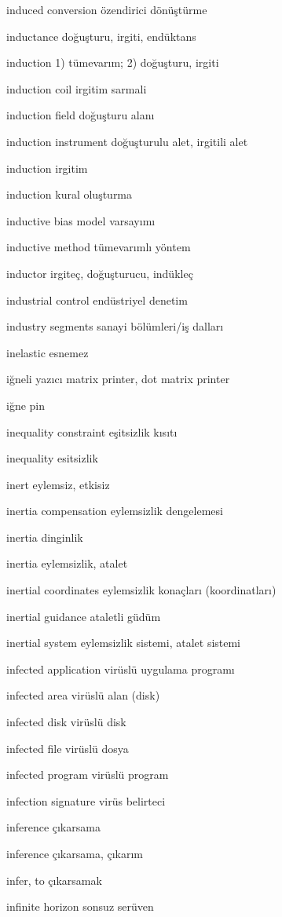 \documentclass[12pt,fleqn]{article}\usepackage{../../common}
\begin{document}
induced conversion özendirici dönüştürme

inductance doğuşturu, irgiti, endüktans

induction 1) tümevarım; 2) doğuşturu, irgiti

induction coil irgitim sarmali

induction field doğuşturu alanı

induction instrument doğuşturulu alet, irgitili alet

induction irgitim

induction kural oluşturma

inductive bias model varsayımı

inductive method tümevarımlı yöntem

inductor irgiteç, doğuşturucu, indükleç

industrial control endüstriyel denetim

industry segments sanayi bölümleri/iş dalları

inelastic esnemez

iğneli yazıcı matrix printer, dot matrix printer

iğne pin

inequality constraint eşitsizlik kısıtı

inequality esitsizlik

inert eylemsiz, etkisiz

inertia compensation eylemsizlik dengelemesi

inertia dinginlik

inertia eylemsizlik, atalet

inertial coordinates eylemsizlik konaçları (koordinatları)

inertial guidance ataletli güdüm

inertial system eylemsizlik sistemi, atalet sistemi

infected application virüslü uygulama programı

infected area virüslü alan (disk)

infected disk virüslü disk

infected file virüslü dosya

infected program virüslü program

infection signature virüs belirteci

inference çıkarsama

inference çıkarsama, çıkarım

infer, to çıkarsamak

infinite horizon sonsuz serüven
\end{document}
